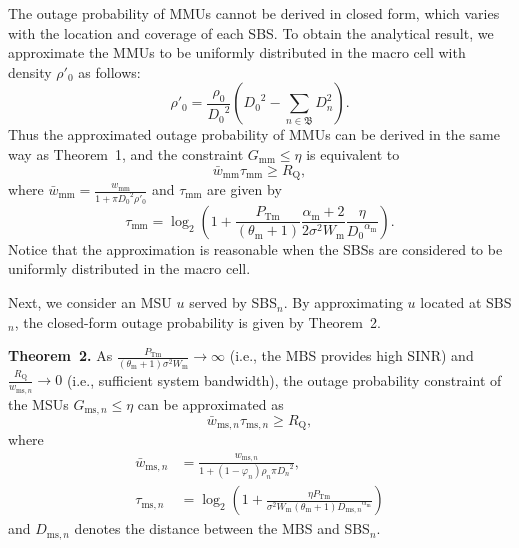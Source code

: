 \documentclass[12pt, draftclsnofoot,onecolumn]{IEEEtran}
\begin{document}
The outage probability of MMUs cannot be derived in closed form, which varies with the location and coverage of each SBS.
To obtain the analytical result, we approximate the MMUs to be uniformly distributed in the macro cell with density $\rho'_\mathrm{0}$ as follows:
\begin{equation}\label{eq_rho_m_uniform}
    \rho'_\mathrm{0} = \frac{\rho_\mathrm{0}}{{D_\mathrm{0}}^2} \left( {D_\mathrm{0}}^2 - \sum\limits_{n\in\mathfrak{B}} D_{n}^2 \right).
\end{equation}
Thus the approximated outage probability of MMUs can be derived in the same way as Theorem~1, and the constraint $G_\mathrm{mm}\leq \eta$ is equivalent to
            \begin{equation}\label{eq_outage_MBS_simple}
                \bar{w}_\mathrm{mm} \tau_\mathrm{mm} \geq R_\mathrm{Q},
            \end{equation}
where $\bar{w}_\mathrm{mm}=\frac{w_\mathrm{mm}}{ 1+ \pi {D_\mathrm{0}}^2 \rho'_\mathrm{0} }$ and $\tau_\mathrm{mm}$ are given by
            \begin{equation}\label{eq_tau_MBS}
                \tau_\mathrm{mm} = \log_2 \left( 1+ \frac{P_\mathrm{Tm}}{(\theta_\mathrm{m}+1)} \frac{\alpha_\mathrm{m}+2}{2 \sigma^2 W_\mathrm{m}} \frac{\eta}{{D_\mathrm{0}}^{\alpha_\mathrm{m}}} \right).
            \end{equation}
Notice that the approximation is reasonable when the SBSs are considered to be uniformly distributed in the macro cell.

Next, we consider an MSU $u$ served by SBS$_n$.
By approximating $u$ located at SBS$_n$, the closed-form outage probability is given by Theorem~2.

    \textbf{Theorem~2.} As $\frac{P_\mathrm{Tm}}{(\theta_\mathrm{m}+1)\sigma^2 W_\mathrm{m}}\rightarrow \infty$ (i.e., the MBS provides high SINR) and $\frac{R_\mathrm{Q}}{w_{\mathrm{ms},n}}\rightarrow 0$ (i.e., sufficient system bandwidth), the outage probability constraint of the MSUs $G_{\mathrm{ms},n} \leq \eta$ can be approximated as
            \begin{equation}\label{eq_outage_ms_simple}
                \bar{w}_{\mathrm{ms},n} \tau_{\mathrm{ms},n} \geq R_\mathrm{Q},
            \end{equation}
    where
            \begin{equation}
                \begin{split}
                \bar{w}_{\mathrm{ms},n} &=\frac{w_{\mathrm{ms},n}}{1+ (1-\varphi_n) \rho_{n} \pi {D_{n}}^2}, \\ 
                \tau_{\mathrm{ms},n}\!  &=\! \log_2 \left( 1\!+ \!\frac{\eta P_\mathrm{Tm}}{\sigma^2 W_\mathrm{m} (\theta_\mathrm{m}+1) {D_{\mathrm{ms},n}}^{\alpha_\mathrm{m}}} \right)
                \end{split}
            \end{equation}
    and $D_{\mathrm{ms},n}$ denotes the distance between the MBS and SBS$_n$.
\end{document}
